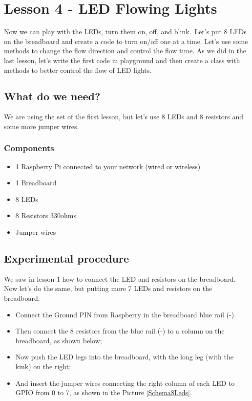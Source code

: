 \documentclass[10pt,twoside,english]{_support/latex/sbabook/sbabook}
\begin{document}
\frontmatter
\pagestyle{plain}

\tableofcontents*
\clearpage\listoffigures

\mainmatter

\chapter{Lesson 4 - LED Flowing Lights}
Now we can play with the LEDs, turn them on, off, and blink. Let's put 8 LEDs on the breadboard and create a code to turn on/off one at a time. Let's use some methods to change the flow direction and control the flow time. As we did in the last lesson, let's write the first code in playground and then create a class with methods to better control the flow of LED lights. 
\section{What do we need?}
We are using the set of the first lesson, but let's use 8 LEDs and 8 resistors and some more jumper wires.
\subsection{Components}
\begin{itemize}
\item 1 Raspberry Pi connected to your network (wired or wireless)
\item 1 Breadboard
\item 8 LEDs
\item 8 Resistors 330ohms
\item Jumper wires
\end{itemize}
\section{Experimental procedure}
We saw in lesson 1 how to connect the LED and resistors on the breadboard. Now let's do the same, but putting more 7 LEDs and resistors on the breadboard. 

\begin{itemize}
\item Connect the Ground PIN from Raspberry in the breadboard blue rail (-). 
\item Then connect the 8 resistors from the blue rail (-) to a column on the breadboard, as shown below;
\item Now push the LED legs into the breadboard, with the long leg (with the kink) on the right;
\item And insert the jumper wires connecting the right column of each LED to GPIO from 0 to 7, as shown in the Picture \ref{Schema8Leds}.
\end{itemize}
\end{document}
